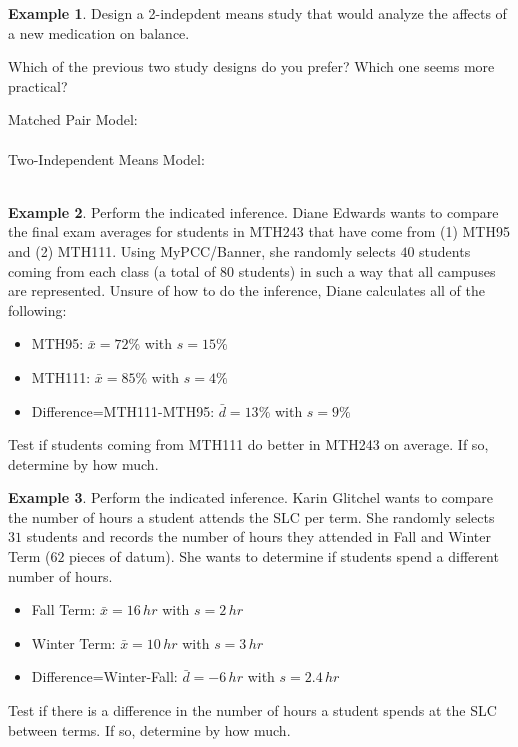 \documentclass[12pt]{amsart}
\theoremstyle{definition}
\newtheorem{ex}{Example}
\begin{document}
\begin{ex}
Design a 2-indepdent means study that would analyze the affects of a new medication on balance.
\end{ex}
\vspace{1in}

\noindent Which of the previous two study designs do you prefer? Which one seems more practical?

\vspace{1in}
\newpage
\noindent Matched Pair Model:\\
~\\
\noindent Two-Independent Means Model:\\
~\\
\begin{ex} Perform the indicated inference. Diane Edwards wants to compare the final exam averages for students in MTH243 that have come from (1) MTH95 and (2) MTH111. Using MyPCC/Banner, she randomly selects $40$ students coming from each class (a total of $80$ students) in such a way that all campuses are represented.
Unsure of how to do the inference, Diane calculates all of the following:
\begin{itemize}
 \item MTH95: $\bar{x}=72\%$ with $s=15\%$
 \item MTH111: $\bar{x}=85\%$ with $s=4\%$
 \item Difference=MTH111-MTH95: $\bar{d}=13\%$ with $s=9\%$
\end{itemize}
Test if students coming from MTH111 do better in MTH243 on average. If so, determine by how much.
\end{ex}
\vfill

\begin{ex} Perform the indicated inference. Karin Glitchel wants to compare the number of hours a student attends the SLC per term. She randomly selects $31$ students and records the number of hours they attended in Fall and Winter Term ($62$ pieces of datum). She wants to determine if students spend a different number of hours.
\begin{itemize}
 \item Fall Term: $\bar{x}=16\,hr$ with $s=2\,hr$
 \item Winter Term: $\bar{x}=10\,hr$ with $s=3\,hr$
 \item Difference=Winter-Fall: $\bar{d}=-6\,hr$ with $s=2.4\,hr$
\end{itemize}
Test if there is a difference in the number of hours a student spends at the SLC between terms. If so, determine by how much.
\end{ex}
\vfill
\end{document}
